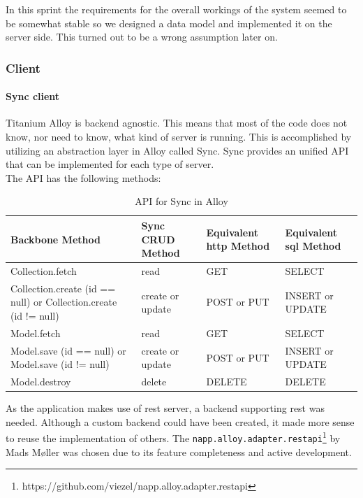 \documentclass[11pt]{book}
\begin{document}
In this sprint the requirements for the overall workings of the system seemed to be somewhat stable so we designed a data model and implemented it on the server side. This turned out to be a wrong assumption later on.

\subsubsection{Client}
\paragraph{Sync client}
Titanium Alloy is backend agnostic. This means that most of the code does not know, nor need to know, what kind of server is running. This is accomplished by utilizing an abstraction layer in Alloy called Sync. Sync provides an unified API that can be implemented for each type of server.\\
The API has the following methods:

\begin{table}[H]
    \centering
    \begin{tabular}{| p{3.5cm} | p{3.5cm} | p{3.5cm} | p{2.5cm} |}
        \hline
        Backbone Method & Sync CRUD Method & Equivalent \gls{http} Method & Equivalent \gls{sql} Method\\
        \hline
        Collection.fetch & read & GET & SELECT\\
        \hline
        Collection.create (id == null) or Collection.create (id != null) & create or update & POST or PUT & INSERT or UPDATE\\
        \hline
        Model.fetch & read    & GET & SELECT\\
        \hline
        Model.save (id == null) or Model.save (id != null) & create or update & POST or PUT & INSERT or UPDATE\\
        \hline
        Model.destroy & delete & DELETE & DELETE\\
        \hline
    \end{tabular}
    \caption{API for Sync in Alloy\cite{titaniumAlloySync}}
    \label{tab:phase_sprint2_model}
\end{table}

As the application makes use of \gls{rest} server, a backend supporting \gls{rest} was needed. Although a custom backend could have been created, it made more sense to reuse the implementation of others. The \texttt{napp.alloy.adapter.restapi}\footnote{https://github.com/viezel/napp.alloy.adapter.restapi} by Mads Møller was chosen due to its feature completeness and active development.
\end{document}
